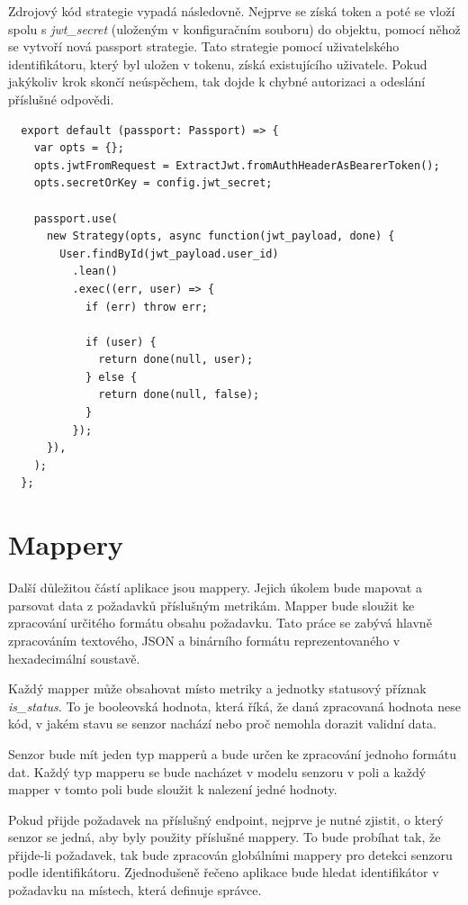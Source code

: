 \documentclass[thesis=M,czech]{FITthesis}[2018/10/20]
\begin{document}
Zdrojový kód strategie vypadá následovně. Nejprve se získá token a poté se vloží spolu s \textit{jwt\_secret} (uloženým v konfiguračním souboru) do objektu, pomocí něhož se vytvoří nová passport strategie. Tato strategie pomocí uživatelského identifikátoru, který byl uložen v tokenu, získá existujícího uživatele. Pokud jakýkoliv krok skončí neúspěchem, tak dojde k chybné autorizaci a odeslání příslušné odpovědi.

\begin{lstlisting}
  export default (passport: Passport) => {
    var opts = {};             
    opts.jwtFromRequest = ExtractJwt.fromAuthHeaderAsBearerToken();
    opts.secretOrKey = config.jwt_secret;
  
    passport.use(
      new Strategy(opts, async function(jwt_payload, done) {
        User.findById(jwt_payload.user_id)
          .lean()
          .exec((err, user) => {
            if (err) throw err;
  
            if (user) {        
              return done(null, user);        
            } else {           
              return done(null, false);       
            }                  
          });
      }),
    );
  };
\end{lstlisting}
\newpage
\section{Mappery}
Další důležitou částí aplikace jsou mappery. Jejich úkolem bude mapovat a parsovat data z požadavků příslušným metrikám. Mapper bude sloužit ke zpracování určitého formátu obsahu požadavku. Tato práce se zabývá hlavně zpracováním textového, JSON a binárního formátu reprezentovaného v hexadecimální soustavě.


Každý mapper může obsahovat místo metriky a jednotky statusový příznak \textit{is\_status}. To je booleovská hodnota, která říká, že daná zpracovaná hodnota nese kód, v jakém stavu se senzor nachází nebo proč nemohla dorazit validní data.


Senzor bude mít jeden typ mapperů a bude určen ke zpracování jednoho formátu dat. Každý typ mapperu se bude nacházet v modelu senzoru v poli a každý mapper v tomto poli bude sloužit k nalezení jedné hodnoty.


Pokud přijde požadavek na příslušný endpoint, nejprve je nutné zjistit, o který senzor se jedná, aby byly použity příslušné mappery. To bude probíhat tak, že přijde-li požadavek, tak bude zpracován globálními mappery pro detekci senzoru podle identifikátoru. Zjednodušeně řečeno aplikace bude hledat identifikátor v požadavku na místech, která definuje správce.
\end{document}
